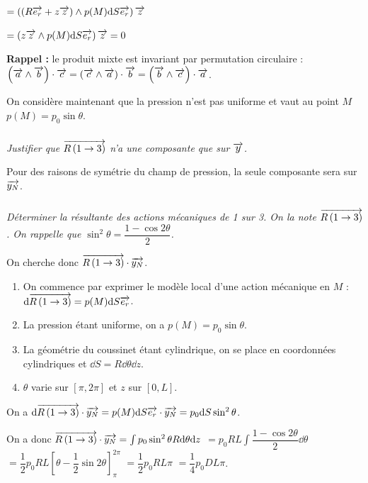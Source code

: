 \documentclass[10pt,fleqn]{article} %
\begin{document}
\begin{multicols}{2}
\begin{multicols}{2}
\begin{corrige}
$ = \left( \left( R\overrightarrow{e_r}+z\overrightarrow{z} \right) \wedge  p(M) \text{d} S \overrightarrow{e_r}\right) \overrightarrow{z}$

$ = \left(z\overrightarrow{z} \wedge  p(M) \text{d} S \overrightarrow{e_r}\right) \overrightarrow{z} = 0$


\textbf{Rappel :} le produit mixte est invariant par permutation circulaire : $\left( \overrightarrow{a}\wedge \overrightarrow{b}\right)\cdot \overrightarrow{c} = \left( \overrightarrow{c}\wedge \overrightarrow{a}\right)\cdot \overrightarrow{b} = \left( \overrightarrow{b}\wedge \overrightarrow{c}\right)\cdot \overrightarrow{a}$.
\end{corrige}
\else
\fi

\vspace{.5cm}

On considère maintenant que la pression n'est pas uniforme et vaut au point $M$ $p(M)=p_0\sin\theta$.
\subparagraph{}\textit{Justifier que  $\overrightarrow{R\left( {1} \rightarrow {3}\right)}$ n'a une composante que sur $\overrightarrow{y}$.}
\ifprof
\begin{corrige}
Pour des raisons de symétrie du champ de pression, la seule composante sera sur $\overrightarrow{y_N}$.
\end{corrige}
\else
\fi


\subparagraph{}\textit{Déterminer la résultante des actions mécaniques de 1 sur 3. On la note $\overrightarrow{R\left( {1} \rightarrow {3}\right)}$. On rappelle que $\sin^2\theta =\dfrac{1-\cos 2\theta }{2}$. }
\ifprof
\begin{corrige}
On cherche donc $\overrightarrow{R\left( {1} \rightarrow {3}\right)} \cdot \overrightarrow{y_N}$.
\begin{enumerate}
\item On commence par exprimer le modèle local d'une action mécanique en $M$ : $\text{d} \overrightarrow{R\left( {1} \rightarrow {3}\right)} = p(M) \text{d} S \overrightarrow{e_r}$.
\item La pression étant uniforme, on a $p(M)=p_0 \sin\theta$.
\item La géométrie du coussinet étant cylindrique, on se place en coordonnées cylindriques et $\dd S = R\dd \theta \dd z$.  
\item $\theta$ varie sur $[\pi, 2\pi]$ et $z$ sur $[0,L]$. 
\end{enumerate}

On a  $\text{d} \overrightarrow{R\left( {1} \rightarrow {3}\right)} \cdot \overrightarrow{y_N} = p(M) \text{d} S \overrightarrow{e_r} \cdot \overrightarrow{y_N} =p_0 \text{d} S  \sin^2 \theta $. 

On a donc $\overrightarrow{R\left( {1} \rightarrow {3}\right)} \cdot \overrightarrow{y_N} = \int  p_0  \sin^2 \theta  R\text{d} \theta \text{d} z $
$ =   p_0 R L \int \dfrac{1-\cos 2\theta }{2}   \dd \theta$
$ =   \dfrac{1}{2}p_0 R L \left[\theta-\dfrac{1}{2}\sin 2\theta \right]^{2\pi}_{\pi} $
$ =   \dfrac{1}{2}p_0 R L {\pi} $
$ =   \dfrac{1}{4}p_0 D L {\pi} $.
\end{corrige}
\else
\fi


\end{multicols}
\end{multicols}
\end{document}
